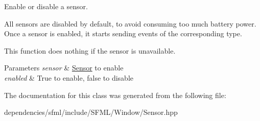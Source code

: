 Enable or disable a sensor. 

All sensors are disabled by default, to avoid consuming too much battery power. Once a sensor is enabled, it starts sending events of the corresponding type.

This function does nothing if the sensor is unavailable.


\begin{DoxyParams}{Parameters}
{\em sensor} & \hyperlink{classsf_1_1_sensor}{Sensor} to enable \\
\hline
{\em enabled} & True to enable, false to disable \\
\hline
\end{DoxyParams}


The documentation for this class was generated from the following file\+:\begin{DoxyCompactItemize}
\item 
dependencies/sfml/include/\+S\+F\+M\+L/\+Window/Sensor.\+hpp\end{DoxyCompactItemize}
